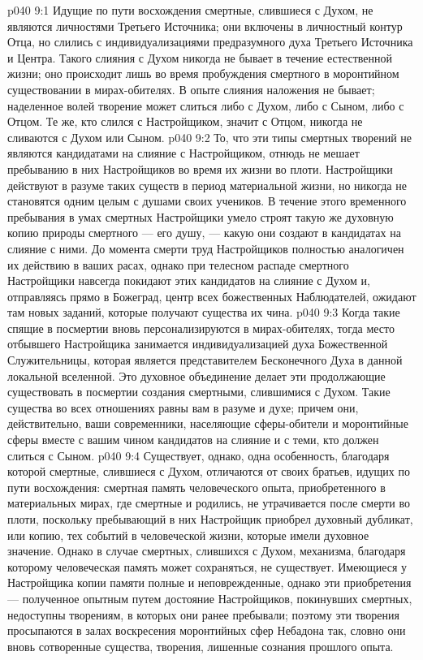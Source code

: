 \vs p040 9:1 Идущие по пути восхождения смертные, слившиеся с Духом, не являются личностями Третьего Источника; они включены в личностный контур Отца, но слились с индивидуализациями предразумного духа Третьего Источника и Центра. Такого слияния с Духом никогда не бывает в течение естественной жизни; оно происходит лишь во время пробуждения смертного в моронтийном существовании в мирах\hyp{}обителях. В опыте слияния наложения не бывает; наделенное волей творение может слиться либо с Духом, либо с Сыном, либо с Отцом. Те же, кто слился с Настройщиком, значит с Отцом, никогда не сливаются с Духом или Сыном.
\vs p040 9:2 \pc То, что эти типы смертных творений не являются кандидатами на слияние с Настройщиком, отнюдь не мешает пребыванию в них Настройщиков во время их жизни во плоти. Настройщики действуют в разуме таких существ в период материальной жизни, но никогда не становятся одним целым с душами своих учеников. В течение этого временного пребывания в умах смертных Настройщики умело строят такую же духовную копию природы смертного --- его душу, --- какую они создают в кандидатах на слияние с ними. До момента смерти труд Настройщиков полностью аналогичен их действию в ваших расах, однако при телесном распаде смертного Настройщики навсегда покидают этих кандидатов на слияние с Духом и, отправляясь прямо в Божеград, центр всех божественных Наблюдателей, ожидают там новых заданий, которые получают существа их чина.
\vs p040 9:3 Когда такие спящие в посмертии вновь персонализируются в мирах\hyp{}обителях, тогда место отбывшего Настройщика занимается индивидуализацией духа Божественной Служительницы, которая является представителем Бесконечного Духа в данной локальной вселенной. Это духовное объединение делает эти продолжающие существовать в посмертии создания смертными, слившимися с Духом. Такие существа во всех отношениях равны вам в разуме и духе; причем они, действительно, ваши современники, населяющие сферы\hyp{}обители и моронтийные сферы вместе с вашим чином кандидатов на слияние и с теми, кто должен слиться с Сыном.
\vs p040 9:4 \pc Существует, однако, одна особенность, благодаря которой смертные, слившиеся с Духом, отличаются от своих братьев, идущих по пути восхождения: смертная память человеческого опыта, приобретенного в материальных мирах, где смертные и родились, не утрачивается после смерти во плоти, поскольку пребывающий в них Настройщик приобрел духовный дубликат, или копию, тех событий в человеческой жизни, которые имели духовное значение. Однако в случае смертных, слившихся с Духом, механизма, благодаря которому человеческая память может сохраняться, не существует. Имеющиеся у Настройщика копии памяти полные и неповрежденные, однако эти приобретения --- полученное опытным путем достояние Настройщиков, покинувших смертных, недоступны творениям, в которых они ранее пребывали; поэтому эти творения просыпаются в залах воскресения моронтийных сфер Небадона так, словно они вновь сотворенные существа, творения, лишенные сознания прошлого опыта.
